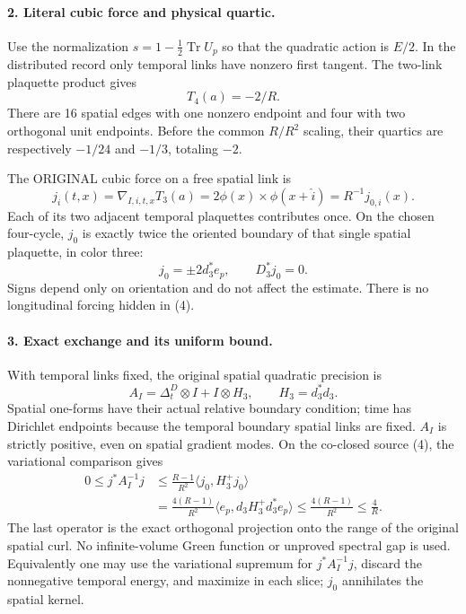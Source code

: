 \documentclass[11pt]{article}
\begin{document}
\paragraph{2. Literal cubic force and physical quartic.}
Use the normalization $s=1-\tfrac12\operatorname{Tr}U_p$ so that the
quadratic action is $E/2$. In the distributed record only temporal
links have nonzero first tangent. The two-link plaquette product gives
\[
 T_4(a)=-2/R.                                                  \tag{2}
\]
There are 16 spatial edges with one nonzero endpoint and four with two
orthogonal unit endpoints. Before the common $R/R^2$ scaling, their
quartics are respectively $-1/24$ and $-1/3$, totaling $-2$.

The ORIGINAL cubic force on a free spatial link is
\[
 j_i(t,x)=\nabla_{I,i,t,x}T_3(a)
       =2\phi(x)\mathbin\times\phi(x+\hat i)=R^{-1}j_{0,i}(x).
                                                               \tag{3}
\]
Each of its two adjacent temporal plaquettes contributes once. On the
chosen four-cycle, $j_0$ is exactly twice the oriented boundary of that
single spatial plaquette, in color three:
\[
 j_0=\pm2d_3^* e_p,\qquad D_3^*j_0=0.                         \tag{4}
\]
Signs depend only on orientation and do not affect the estimate.
There is no longitudinal forcing hidden in (4).

\paragraph{3. Exact exchange and its uniform bound.}
With temporal links fixed, the original spatial quadratic precision is
\[
 A_I=\Delta_t^D\otimes I+I\otimes H_3,
 \qquad H_3=d_3^*d_3.                                        \tag{5}
\]
Spatial one-forms have their actual relative boundary condition;
time has Dirichlet endpoints because the temporal boundary spatial
links are fixed. $A_I$ is strictly positive, even on spatial gradient
modes. On the co-closed source (4), the variational comparison gives
\[
 \begin{split}
 0\le j^*A_I^{-1}j
 &\le\frac{R-1}{R^2}\langle j_0,H_3^+j_0\rangle\\
 &=\frac{4(R-1)}{R^2}
       \langle e_p,d_3H_3^+d_3^*e_p\rangle
 \le\frac{4(R-1)}{R^2}\le\frac4R .
 \end{split} \tag{6}
\]
The last operator is the exact orthogonal projection onto the range
of the original spatial curl. No infinite-volume Green function or
unproved spectral gap is used. Equivalently one may use the variational
supremum for $j^*A_I^{-1}j$, discard the nonnegative temporal energy,
and maximize in each slice; $j_0$ annihilates the spatial kernel.
\end{document}

